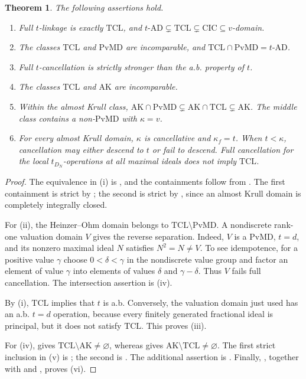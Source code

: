 \documentclass[11pt]{amsart}
\newtheorem{theorem}{Theorem}[section]
\theoremstyle{definition}
\theoremstyle{remark}
\newcommand{\PvMD}{\mathrm{PvMD}}
\newcommand{\TCL}{\mathrm{TCL}}
\newcommand{\CIC}{\mathrm{CIC}}
\newcommand{\AK}{\mathrm{AK}}
\newcommand{\tAD}{t\text{-}\mathrm{AD}}
\begin{document}
\begin{theorem}\label{thm:placement}
The following assertions hold.
\begin{enumerate}[label=\textup{(\roman*)}]
\item Full $t$-linkage is exactly $\TCL$, and
      $\tAD\subsetneq\TCL\subsetneq\CIC\subseteq v$-domain.
\item The classes $\TCL$ and $\PvMD$ are incomparable, and
      $\TCL\cap\PvMD=\tAD$.
\item Full $t$-cancellation is strictly stronger than the a.b. property of
      $t$.
\item The classes $\TCL$ and $\AK$ are incomparable.
\item Within the almost Krull class,
      $\AK\cap\PvMD\subsetneq\AK\cap\TCL\subsetneq\AK$.
      The middle class contains a non-$\PvMD$ with $\kappa=v$.
\item For every almost Krull domain, $\kappa$ is cancellative and
      $\kappa_f=t$.  When $t<\kappa$, cancellation may either descend to
      $t$ or fail to descend.  Full cancellation for the local
      $t_{D_N}$-operations at all maximal ideals does not imply $\TCL$.
\end{enumerate}
\end{theorem}

\begin{proof}
The equivalence in (i) is , and the
containments follow from .  The first containment
is strict by ; the second is strict by
, since an almost Krull domain is completely integrally
closed.

For (ii), the Heinzer--Ohm domain belongs to
$\TCL\setminus\PvMD$.  A nondiscrete rank-one valuation domain $V$ gives
the reverse separation.  Indeed, $V$ is a $\PvMD$, $t=d$, and its nonzero
maximal ideal $N$ satisfies $N^2=N\ne V$.  To see idempotence, for a
positive value $\gamma$ choose $0<\delta<\gamma$ in the nondiscrete value
group and factor an element of value $\gamma$ into elements of values
$\delta$ and $\gamma-\delta$.  Thus $V$ fails full cancellation.  The
intersection assertion is (iv).

By (i), $\TCL$ implies that $t$ is a.b.  Conversely,
the valuation domain just used has an a.b. $t=d$ operation, because every
finitely generated fractional ideal is principal, but it does not satisfy
$\TCL$.  This proves (iii).

For (iv),  gives
$\TCL\setminus\AK\ne\varnothing$, whereas  gives
$\AK\setminus\TCL\ne\varnothing$.  The first strict inclusion in (v)
is ; the second is .  The
additional assertion is .  Finally,
, together with  and
, proves (vi).
\end{proof}
\end{document}
